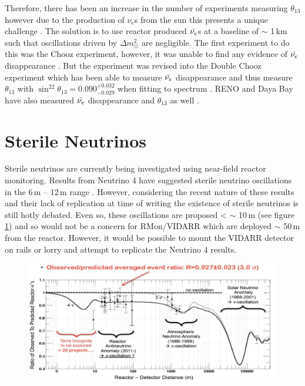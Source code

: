 Therefore, there has been an increase in the number of experiments measuring $\theta_{13}$ however due to the production of $\nu_e$s from the sun this presents a unique challenge \cite{Olive_2014}. The solution is to use reactor produced $\Bar{\nu_e}$s at a baseline of $\sim$ 1\,km such that oscillations driven by $\Delta m_\odot^2$ are negligible. The first experiment to do this was the Chooz experiment, however, it was unable to find any evidence of $\Bar{\nu_e}$ disappearance \cite{Olive_2014}. But the experiment was revised into the Double Chooz experiment which has been able to measure $\Bar{\nu_e}$ disappearance and thus measure $\theta_{13}$ with $\sin^22\theta_{13} = 0.090^{+0.032}_{-0.029}$ when fitting to spectrum \cite{abe2014improved}. RENO and Daya Bay have also measured $\Bar{\nu_e}$ disappearance and $\theta_{13}$ as well \cite{Olive_2014}.  

\section{Sterile Neutrinos}
Sterile neutrinos are currently being investigated using near-field reactor monitoring. Results from Neutrino 4 have suggested sterile neutrino oscillations in the 6\,m -- 12\,m range \cite{neutrino4_2021}. However, considering the recent nature of these results and their lack of replication at time of writing the existence of sterile neutrinos is still hotly debated. Even so, these oscillations are proposed < $\sim$ 10\,m \cite{neutrino4_2021} (see figure \ref{fig:neutrino4Plot}) and so would not be a concern for RMon/VIDARR which are deployed $\sim$ 50\,m from the reactor. However, it would be possible to mount the VIDARR detector on rails or lorry and attempt to replicate the Neutrino 4 results. 

\begin{figure}[!h]
 \centering
 \includegraphics[width=0.8\linewidth]{Chapter2/Figs/neutrino4Plot.jpg}
 \label{fig:neutrino4Plot}
\end{figure}

